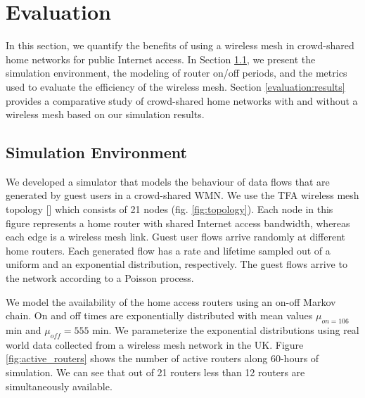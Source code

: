 \section{Evaluation}
\label{sec:evaluation}

In this section, we quantify the benefits of using a wireless mesh in crowd-shared home networks for public Internet access. In Section \ref{evaluation:environment}, we present the simulation environment, the modeling of router on/off periods, and the metrics used to evaluate the efficiency of the wireless mesh. Section \ref{evaluation:results} provides a comparative study of crowd-shared home networks with and without a wireless mesh based on our simulation results.

\subsection{Simulation Environment}
\label{evaluation:environment}


We developed a simulator that models the behaviour of data flows that are generated by guest users in a crowd-shared WMN. We use the TFA wireless mesh topology [] which consists of 21 nodes (fig. \ref{fig:topology}). Each node in this figure represents a home router with shared Internet access bandwidth, whereas each edge is a wireless mesh link. Guest user flows arrive randomly at different home routers. Each generated flow has a rate and lifetime sampled out of a uniform and an exponential distribution, respectively. The guest flows arrive to the network according to a Poisson process.

We model the availability of the home access routers using an on-off Markov chain. On and off times are exponentially distributed with mean values $\mu_{on = 106}$ min and $\mu_{off} = 555$ min. We parameterize the exponential distributions using real world data collected from a wireless mesh network in the UK. Figure \ref{fig:active_routers} shows the number of active routers along 60-hours of simulation. We can see that out of 21 routers less than 12 routers are simultaneously available.

